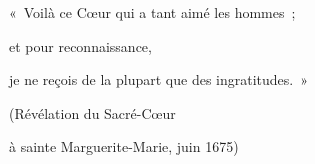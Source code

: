«~Voilà ce Cœur qui a tant aimé les hommes~;\par
et pour reconnaissance,\par
je ne reçois de la plupart que des ingratitudes.~»\par
(Révélation du Sacré-Cœur\par
à sainte Marguerite-Marie, juin 1675)